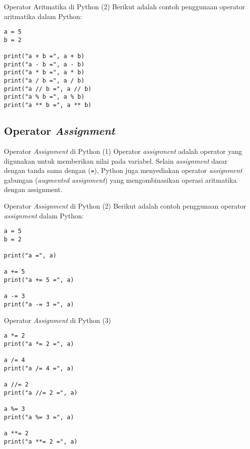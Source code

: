 \documentclass[aspectratio=169, table]{beamer}
\begin{document}
\begin{frame}[fragile]{Operator Aritmatika di Python (2)}
Berikut adalah contoh penggunaan operator aritmatika dalam Python:
\begin{lstlisting}[style=PythonStyle, caption={Kode Python: arithmetic_operator.py}]
a = 5
b = 2

print("a + b =", a + b)
print("a - b =", a - b)
print("a * b =", a * b)
print("a / b =", a / b)
print("a // b =", a // b)
print("a % b =", a % b)
print("a ** b =", a ** b)
\end{lstlisting}
\end{frame}

\subsection{Operator \textit{Assignment}}

\begin{frame}[fragile]{Operator \textit{Assignment} di Python (1)}
Operator \textit{assignment} adalah operator yang digunakan untuk memberikan nilai pada variabel. 
Selain \textit{assignment} dasar dengan tanda sama dengan (\texttt{=}), Python juga menyediakan operator 
\textit{assignment} gabungan (\textit{augmented assignment}) yang mengombinasikan operasi aritmatika dengan assignment.
\end{frame}

\begin{frame}[fragile]{Operator \textit{Assignment} di Python (2)}
Berikut adalah contoh penggunaan operator \textit{assignment} dalam Python:
\begin{lstlisting}[style=PythonStyle, caption={Kode Python: assignment_operator.py}]
a = 5
b = 2

print("a =", a)

a += 5
print("a += 5 =", a)

a -= 3
print("a -= 3 =", a)
\end{lstlisting}
\end{frame}

\begin{frame}[fragile]{Operator \textit{Assignment} di Python (3)}

\begin{lstlisting}[style=PythonStyle, caption={Kode Python: assignment_operator.py}]
a *= 2
print("a *= 2 =", a)

a /= 4
print("a /= 4 =", a)

a //= 2
print("a //= 2 =", a)

a %= 3
print("a %= 3 =", a)

a **= 2
print("a **= 2 =", a)
\end{lstlisting}

\end{frame}
\end{document}
